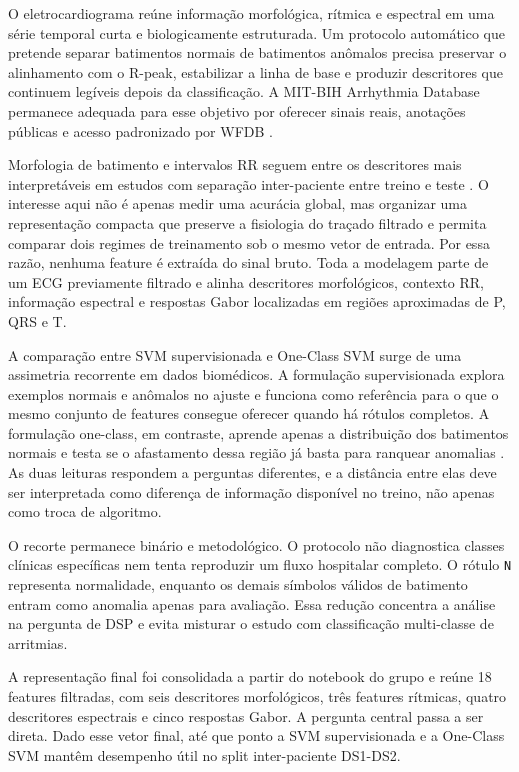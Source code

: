 O eletrocardiograma reúne informação morfológica, rítmica e espectral em uma
série temporal curta e biologicamente estruturada. Um protocolo automático que
pretende separar batimentos normais de batimentos anômalos precisa preservar o
alinhamento com o R-peak, estabilizar a linha de base e produzir descritores
que continuem legíveis depois da classificação. A MIT-BIH Arrhythmia Database
permanece adequada para esse objetivo por oferecer sinais reais, anotações
públicas e acesso padronizado por WFDB
\citep{moody2001mitdb,goldberger2000physionet,wfdb2022software}.

Morfologia de batimento e intervalos RR seguem entre os descritores mais
interpretáveis em estudos com separação inter-paciente entre treino e teste
\citep{dechazal2004heartbeat,doquire2011featureselection,mousavi2019inter}. O
interesse aqui não é apenas medir uma acurácia global, mas organizar uma
representação compacta que preserve a fisiologia do traçado filtrado e permita
comparar dois regimes de treinamento sob o mesmo vetor de entrada. Por essa
razão, nenhuma feature é extraída do sinal bruto. Toda a modelagem parte de um
ECG previamente filtrado e alinha descritores morfológicos, contexto RR,
informação espectral e respostas Gabor localizadas em regiões aproximadas de P,
QRS e T.

A comparação entre SVM supervisionada e One-Class SVM surge de uma assimetria
recorrente em dados biomédicos. A formulação supervisionada explora exemplos
normais e anômalos no ajuste e funciona como referência para o que o mesmo
conjunto de features consegue oferecer quando há rótulos completos. A
formulação one-class, em contraste, aprende apenas a distribuição dos
batimentos normais e testa se o afastamento dessa região já basta para ranquear
anomalias \citep{cortes1995support,scholkopf2001support,pimentel2014novelty}.
As duas leituras respondem a perguntas diferentes, e a distância entre elas
deve ser interpretada como diferença de informação disponível no treino, não
apenas como troca de algoritmo.

O recorte permanece binário e metodológico. O protocolo não diagnostica classes
clínicas específicas nem tenta reproduzir um fluxo hospitalar completo. O
rótulo \texttt{N} representa normalidade, enquanto os demais símbolos válidos
de batimento entram como anomalia apenas para avaliação. Essa redução concentra
a análise na pergunta de DSP e evita misturar o estudo com classificação
multi-classe de arritmias.

A representação final foi consolidada a partir do notebook do grupo e reúne 18
features filtradas, com seis descritores morfológicos, três features rítmicas,
quatro descritores espectrais e cinco respostas Gabor. A pergunta central passa
a ser direta. Dado esse vetor final, até que ponto a SVM supervisionada e a
One-Class SVM mantêm desempenho útil no split inter-paciente DS1-DS2.

